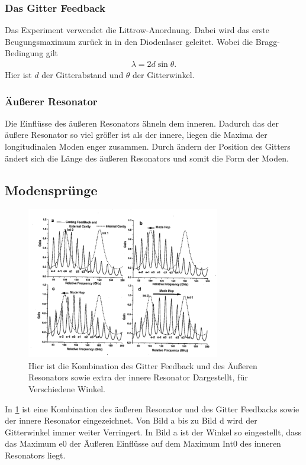 \subsubsection{Das Gitter Feedback}
Das Experiment verwendet die Littrow-Anordnung.
Dabei wird das erste Beugungsmaximum zurück in in den Diodenlaser geleitet.
Wobei die Bragg-Bedingung gilt
\begin{align}
	\lambda = 2d\sin\theta.
\end{align}
Hier ist $d$ der Gitterabstand und $\theta$ der Gitterwinkel.
\subsubsection{Äußerer Resonator}
Die Einflüsse des äußeren Resonators ähneln dem inneren. 
Dadurch das der äußere Resonator so viel größer ist als der innere, liegen die Maxima der longitudinalen Moden enger zusammen.
Durch ändern der Position des Gitters ändert sich die Länge des äußeren Resonators und somit die Form der Moden.
\subsection{Modensprünge}
\begin{figure}[h!]
	\centering
	\includegraphics[width = 0.75\textwidth, angle = 1]{../Grafiken/Moden_Spruenge.pdf}
	\caption{Hier ist die Kombination des Gitter Feedback und des Äußeren Resonators sowie extra der innere Resonator Dargestellt, für Verschiedene Winkel.\cite{V60}\label{fig:Moden_Spruenge}}
\end{figure}
In \cref{fig:Moden_Spruenge} ist eine Kombination des äußeren Resonator und des Gitter Feedbacks sowie der innere Resonator eingezeichnet.
Von Bild a bis zu Bild d wird der Gitterwinkel immer weiter Verringert.
In Bild a ist der Winkel so eingestellt, dass das Maximum e0 der Äußeren Einflüsse auf dem Maximum Int0 des inneren Resonators liegt.
